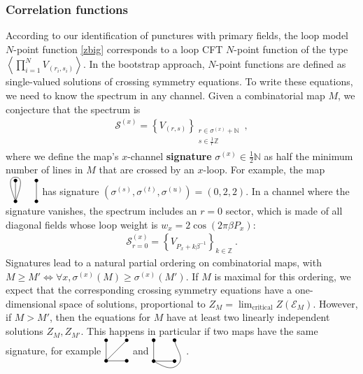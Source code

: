 \documentclass[12pt, a4paper]{article}
\newcommand{\myindex}[1]{\textbf{\boldmath #1}}
\newcommand{\vertices}{
\coordinate (base) at (0, 1);
\draw (0, 0) node[fill, circle, minimum size = 1.3mm, inner sep = 0]{};
  \draw (3, 0) node[fill, circle, minimum size = 1.3mm, inner sep = 0]{};
  \draw (0, 3) node[fill, circle, minimum size = 1.3mm, inner sep = 0]{};
  \draw (3, 3) node[fill, circle, minimum size = 1.3mm, inner sep = 0]{};
}
\theoremstyle{break}
\begin{document}
\subsubsection{Correlation functions}\label{sec:cf}

According to our identification of punctures with primary fields, the loop model $N$-point function \eqref{zbig} corresponds to a loop CFT $N$-point function of the type $\left<\prod_{i=1}^N V_{(r_i,s_i)}\right>$. In the bootstrap approach, $N$-point functions are defined as single-valued solutions of crossing symmetry equations. To write these equations, we need to know the spectrum in any channel. Given a combinatorial map $M$, we conjecture that the spectrum is 
\begin{align}
 \mathcal{S}^{(x)} = \left\{V_{(r,s)}\right\}_{\substack{r\in \sigma^{(x)}+\mathbb{N} \\ s\in\frac{1}{r}\mathbb{Z}}}\ ,
 \label{sxs}
\end{align}
where we define the map's $x$-channel \myindex{signature} $\sigma^{(x)}\in\frac12\mathbb{N}$ as half the minimum number of lines in $M$ that are crossed by an $x$-loop. For example, the map 
$
\begin{tikzpicture}[baseline=(base), scale = .25]
 \vertices
  \draw (0, 0) -- (0, 3);
  \draw (3, 0) -- (3, 3);
  \draw (0, 0) to [out = 70, in = 0] (0, 3.5) to [out = 180, in = 110] (0, 0);
 \end{tikzpicture}
 $
has signature $(\sigma^{(s)},\sigma^{(t)},\sigma^{(u)})=(0,2,2)$. In a channel where the signature vanishes, the spectrum includes an $r=0$ sector, which is made of all diagonal fields whose loop weight is $w_x=2\cos(2\pi\beta P_x)$:
\begin{align}
 \mathcal{S}^{(x)}_{r=0} = \left\{V_{P_x+k\beta^{-1}}\right\}_{k\in\mathbb{Z}}\ . 
 \label{srz}
\end{align}
Signatures lead to a natural partial ordering on combinatorial maps, with $M\geq M' \iff \forall x, \sigma^{(x)}(M)\geq \sigma^{(x)}(M')$. If $M$ is maximal for this ordering, we expect that the corresponding crossing symmetry equations have a one-dimensional space of solutions, proportional to $Z_M = \lim_\text{critical} Z(\mathcal{E}_M)$. However, if $M> M'$, then the equations for $M$ have at least two linearly independent solutions $Z_M,Z_{M'}$. This happens in particular if two maps have the same signature, for example 
$
\begin{tikzpicture}[baseline=(base), scale = .25]
 \vertices
  \draw (0, 0) -- (0, 3);
  \draw (0, 0) -- (3, 3);
  \draw (0, 0) -- (3, 0);
 \end{tikzpicture}
$ and $
 \begin{tikzpicture}[baseline=(base), scale = .25]
 \vertices
  \draw (0, 0) -- (3, 0);
  \draw (0, 0) -- (0, 3);
  \draw (0, 0) to [out = -30, in = -135] (3.5, -.5) to [out = 45, in = -80] (3, 3);
  \end{tikzpicture}
$. 
\end{document}
